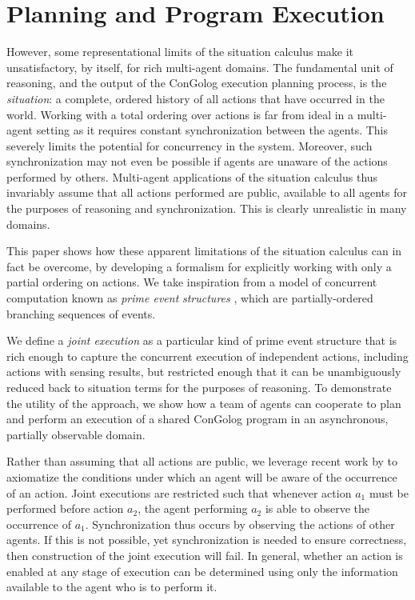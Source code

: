 


\chapter{Planning and Program Execution}

\label{ch:planning} 

However, some representational limits of the situation calculus make
it unsatisfactory, by itself, for rich multi-agent domains. The fundamental
unit of reasoning, and the output of the ConGolog execution planning
process, is the \emph{situation}: a complete, ordered history of all
actions that have occurred in the world. Working with a total ordering
over actions is far from ideal in a multi-agent setting as it requires
constant synchronization between the agents. This severely limits
the potential for concurrency in the system. Moreover, such synchronization
may not even be possible if agents are unaware of the actions performed
by others. Multi-agent applications of the situation calculus thus
invariably assume that all actions performed are public, available
to all agents for the purposes of reasoning and synchronization. This
is clearly unrealistic in many domains.

This paper shows how these apparent limitations of the situation calculus
can in fact be overcome, by developing a formalism for explicitly
working with only a partial ordering on actions. We take inspiration
from a model of concurrent computation known as \emph{prime event}
\emph{structures} \citep{npw79event_structures}, which are partially-ordered
branching sequences of events.\emph{ }

We define a \emph{joint execution} as a particular kind of prime event
structure that is rich enough to capture the concurrent execution
of independent actions, including actions with sensing results, but
restricted enough that it can be unambiguously reduced back to situation
terms for the purposes of reasoning. To demonstrate the utility of
the approach, we show how a team of agents can cooperate to plan and
perform an execution of a shared ConGolog program in an asynchronous,
partially observable domain.

Rather than assuming that all actions are public, we leverage recent
work by \citep{kelly07sc_know_obs} to axiomatize the conditions under
which an agent will be aware of the occurrence of an action. Joint
executions are restricted such that whenever action $a_{1}$ must
be performed before action $a_{2}$, the agent performing $a_{2}$
is able to observe the occurrence of $a_{1}$. Synchronization thus
occurs by observing the actions of other agents. If this is not possible,
yet synchronization is needed to ensure correctness, then construction
of the joint execution will fail. In general, whether an action is
enabled at any stage of execution can be determined using only the
information available to the agent who is to perform it.

